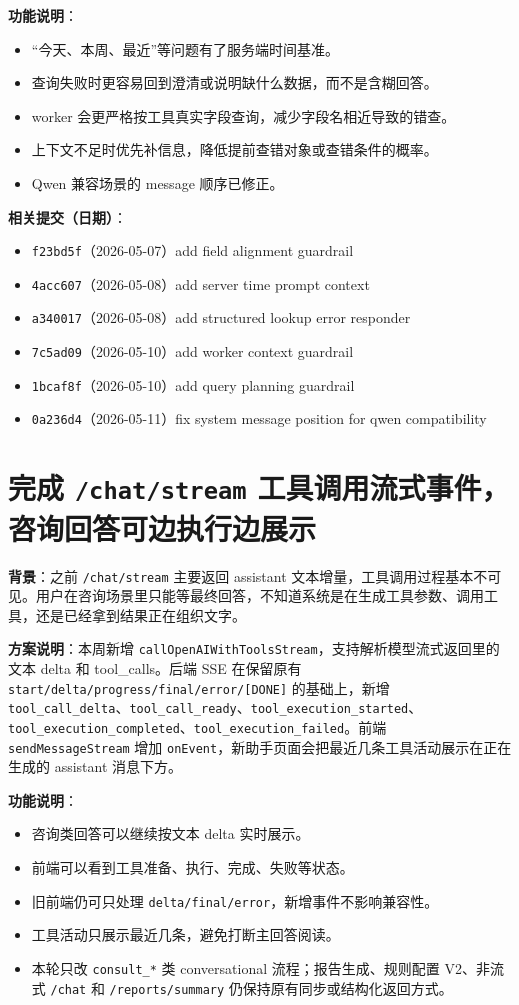 \documentclass[UTF8]{ctexart}
\begin{document}
\textbf{功能说明}：
\begin{itemize}
\item ``今天、本周、最近''等问题有了服务端时间基准。
\item 查询失败时更容易回到澄清或说明缺什么数据，而不是含糊回答。
\item worker 会更严格按工具真实字段查询，减少字段名相近导致的错查。
\item 上下文不足时优先补信息，降低提前查错对象或查错条件的概率。
\item Qwen 兼容场景的 message 顺序已修正。
\end{itemize}

\textbf{相关提交（日期）}：
\begin{itemize}
\item \texttt{f23bd5f}（2026-05-07）add field alignment guardrail
\item \texttt{4acc607}（2026-05-08）add server time prompt context
\item \texttt{a340017}（2026-05-08）add structured lookup error responder
\item \texttt{7c5ad09}（2026-05-10）add worker context guardrail
\item \texttt{1bcaf8f}（2026-05-10）add query planning guardrail
\item \texttt{0a236d4}（2026-05-11）fix system message position for qwen compatibility
\end{itemize}

\section{完成 \texttt{/chat/stream} 工具调用流式事件，咨询回答可边执行边展示}

\textbf{背景}：之前 \texttt{/chat/stream} 主要返回 assistant 文本增量，工具调用过程基本不可见。用户在咨询场景里只能等最终回答，不知道系统是在生成工具参数、调用工具，还是已经拿到结果正在组织文字。

\textbf{方案说明}：本周新增 \texttt{callOpenAIWithToolsStream}，支持解析模型流式返回里的文本 delta 和 tool\_calls。后端 SSE 在保留原有 \texttt{start/delta/progress/final/error/[DONE]} 的基础上，新增 \texttt{tool\_call\_delta}、\texttt{tool\_call\_ready}、\texttt{tool\_execution\_started}、\texttt{tool\_execution\_completed}、\texttt{tool\_execution\_failed}。前端 \texttt{sendMessageStream} 增加 \texttt{onEvent}，新助手页面会把最近几条工具活动展示在正在生成的 assistant 消息下方。

\textbf{功能说明}：
\begin{itemize}
\item 咨询类回答可以继续按文本 delta 实时展示。
\item 前端可以看到工具准备、执行、完成、失败等状态。
\item 旧前端仍可只处理 \texttt{delta/final/error}，新增事件不影响兼容性。
\item 工具活动只展示最近几条，避免打断主回答阅读。
\item 本轮只改 \texttt{consult\_*} 类 conversational 流程；报告生成、规则配置 V2、非流式 \texttt{/chat} 和 \texttt{/reports/summary} 仍保持原有同步或结构化返回方式。
\end{itemize}
\end{document}
